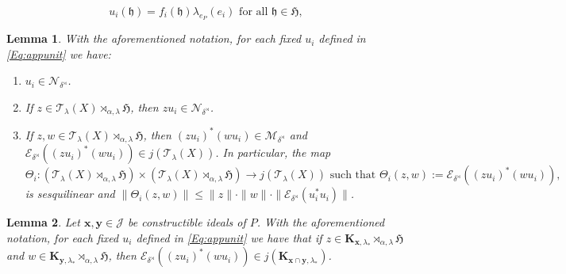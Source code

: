 \documentclass[10pt,a4paper]{amsart}
\newtheorem{lemma}{Lemma}
\newcommand{\E}{{\mathcal{E}}}
\newcommand{\J}{{\mathcal{J}}}
\newcommand{\M}{{\mathcal{M}}}
\newcommand{\N}{{\mathcal{N}}}
\newcommand{\T}{{\mathcal{T}}}
\def\al{\alpha}
\newcommand{\bo}[1]{\mathbf{#1}} %
\def\de{\delta}
\newcommand{\fH}{{\mathfrak{H}}}
\newcommand{\fh}{{\mathfrak{h}}}
\newcommand{\foral}{\text{ for all }}
\def\la{\lambda}
\begin{document}
\begin{equation}\label{Eq:appunit}
u_i(\fh)=f_i(\fh)\la_{e_P}(e_i) \foral \fh\in \fH,
\end{equation}

\begin{lemma}\label{L:local1}
With the aforementioned notation, for each fixed $u_i$ defined in \eqref{Eq:appunit} we have:
\begin{enumerate}
\item $u_i \in \N_{\de^\rtimes}$.
\item If $z\in\T_\la(X)\rtimes_{\al,\la}\fH$, then $z u_i \in \N_{\de^\rtimes}$.

\item If $z,w\in \T_\la(X)\rtimes_{\al,\la}\fH$, then
$(z u_i)^*(w u_i)\in\M_{\de^{\rtimes}}$ and
$\E_{\de^{\rtimes}}((z u_i)^*(w u_i))\in j(\T_\la(X))$.
In particular, the map
\[
\Theta_i \colon
(\T_\la(X)\rtimes_{\al,\la}\fH)\times
(\T_\la(X)\rtimes_{\al,\la}\fH)\to j(\T_\la(X))
\text{ such that }
\Theta_i(z,w)
:=
\E_{\de^{\rtimes}}((zu_i)^*(w u_i)),
\]
is sesquilinear and
$\|\Theta_i(z,w)\|
\leq
\|z\|\cdot \|w\|\cdot \|\E_{\de^\rtimes}(u_i^*u_i)\|$.

\end{enumerate}
\end{lemma}

\begin{lemma}\label{L:invar}
Let $\bo{x}, \bo{y} \in \J$ be constructible ideals of $P$. With the aforementioned notation, for each fixed $u_i$ defined in \eqref{Eq:appunit} we have that if $z\in \bo{K}_{\bo{x},\la_\ast}\rtimes_{\al,\la}\fH$ and
$w\in \bo{K}_{\bo{y},\la_\ast}\rtimes_{\al,\la}\fH$, then
$\E_{\de^{\rtimes}}((z u_i)^*(w u_i))\in j(\bo{K}_{\bo{x}\cap \bo{y},\la_\ast})$.
\end{lemma}
\end{document}
